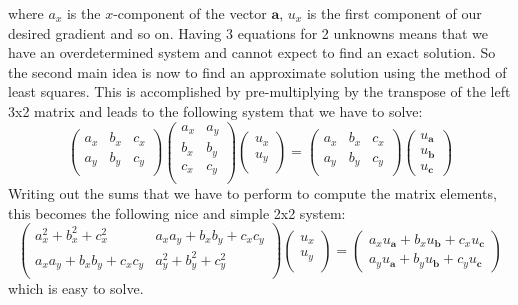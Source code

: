 where $a_x$ is the $x$-component of the vector $\mathbf{a}$, $u_x$ is the first component of our desired gradient and so on. Having 3 equations for 2 unknowns means that we have an overdetermined system and cannot expect to find an exact solution. So the second main idea is now to find an approximate solution using the method of least squares. This is accomplished by pre-multiplying by the transpose of the left 3x2 matrix and leads to the following system that we have to solve:
\begin{equation}
\begin{pmatrix}
a_x & b_x & c_x  \\
a_y & b_y & c_y  \\
\end{pmatrix}
\begin{pmatrix}
a_x & a_y  \\
b_x & b_y  \\
c_x & c_y  \\
\end{pmatrix}
\begin{pmatrix}
u_x  \\
u_y  \\
\end{pmatrix}
=
\begin{pmatrix}
a_x & b_x & c_x  \\
a_y & b_y & c_y  \\
\end{pmatrix}
\begin{pmatrix}
u_{\mathbf{a}}  \\
u_{\mathbf{b}}  \\
u_{\mathbf{c}}
\end{pmatrix}
\end{equation}
Writing out the sums that we have to perform to compute the matrix elements, this becomes the following nice and simple 2x2 system:
\begin{equation}
\begin{pmatrix}
	a_x^2 + b_x^2 + c_x^2 & a_x a_y + b_x b_y + c_x c_y \\
 a_x a_y + b_x b_y + c_x c_y & a_y^2 + b_y^2 + c_y^2  \\
\end{pmatrix}
\begin{pmatrix}
u_x  \\
u_y  \\
\end{pmatrix}
= 
\begin{pmatrix}
a_x u_{\mathbf{a}} + b_x u_{\mathbf{b}} + c_x u_{\mathbf{c}} \\
a_y u_{\mathbf{a}} + b_y u_{\mathbf{b}} + c_y u_{\mathbf{c}}
\end{pmatrix}
\end{equation}
which is easy to solve.

